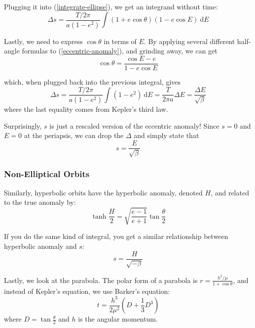 \documentclass{article}
\newcommand{\dd}{\mathrm{d}}
\numberwithin{equation}{subsection}
\begin{document}
Plugging it into (\ref{integrate-ellipse}), we get an integrand without time:
\begin{equation}
\Delta s = \frac{T / 2 \pi}{a (1-e^2)} \int (1 + e \cos \theta)(1 - e \cos E)~\dd E
\end{equation}

Lastly, we need to express $\cos \theta$ in terms of $E$. By applying several different half-angle formulas to (\ref{eccentric-anomaly}), and grinding away, we can get
\begin{equation}
\cos \theta = \frac{\cos E - e}{1 - e \cos E}
\end{equation}

which, when plugged back into the previous integral, gives
\begin{equation}
\Delta s = \frac{T / 2 \pi}{a(1 - e^2)} \int (1 - e^2)~\dd E = \frac{T}{2 \pi a} \Delta E = \frac{\Delta E}{\sqrt \beta}
\end{equation}
where the last equality comes from Kepler's third law.

Surprisingly, $s$ is just a rescaled version of the eccentric anomaly! Since $s = 0$ and $E = 0$ at the periapsis, we can drop the $\Delta$ and simply state that
\begin{equation}
s = \frac{E}{\sqrt \beta}
\end{equation}

\subsubsection*{Non-Elliptical Orbits}

Similarly, hyperbolic orbits have the hyperbolic anomaly, denoted $H$, and related to the true anomaly by:
\begin{equation}
\label{hyperbolic-anomaly}
\tanh{\frac{H}{2}} = \sqrt{\frac{e-1}{e+1}} \tan{\frac{\theta}{2}}
\end{equation}

If you do the same kind of integral, you get a similar relationship between hyperbolic anomaly and $s$:
\begin{equation}
s = \frac{H}{\sqrt{-\beta}}
\end{equation}

Lastly, we look at the parabola. The polar form of a parabola is $r = \frac{h^2/\mu}{1 + \cos \theta}$, and instead of Kepler's equation, we use Barker's equation:
\begin{equation}
\label{barker}
t = \frac{h^3}{2 \mu^2} (D + \frac{1}{3} D^3)
\end{equation}
where $D = \tan \frac{\theta}{2}$ and $h$ is the angular momentum.
\end{document}
